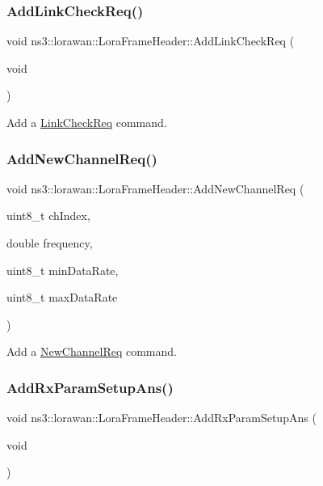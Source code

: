\subsubsection{\texorpdfstring{Add\+Link\+Check\+Req()}{AddLinkCheckReq()}}
{\footnotesize\ttfamily void ns3\+::lorawan\+::\+Lora\+Frame\+Header\+::\+Add\+Link\+Check\+Req (\begin{DoxyParamCaption}\item[{void}]{ }\end{DoxyParamCaption})}

Add a \hyperlink{classns3_1_1lorawan_1_1LinkCheckReq}{Link\+Check\+Req} command. \mbox{\label{classns3_1_1lorawan_1_1LoraFrameHeader_a30b475f8cbb1151fbe0369ffc5ee6441}} 
\subsubsection{\texorpdfstring{Add\+New\+Channel\+Req()}{AddNewChannelReq()}}
{\footnotesize\ttfamily void ns3\+::lorawan\+::\+Lora\+Frame\+Header\+::\+Add\+New\+Channel\+Req (\begin{DoxyParamCaption}\item[{uint8\+\_\+t}]{ch\+Index,  }\item[{double}]{frequency,  }\item[{uint8\+\_\+t}]{min\+Data\+Rate,  }\item[{uint8\+\_\+t}]{max\+Data\+Rate }\end{DoxyParamCaption})}

Add a \hyperlink{classns3_1_1lorawan_1_1NewChannelReq}{New\+Channel\+Req} command. \mbox{\label{classns3_1_1lorawan_1_1LoraFrameHeader_a455c58eda429169dffe119433cb8d70b}} 
\subsubsection{\texorpdfstring{Add\+Rx\+Param\+Setup\+Ans()}{AddRxParamSetupAns()}}
{\footnotesize\ttfamily void ns3\+::lorawan\+::\+Lora\+Frame\+Header\+::\+Add\+Rx\+Param\+Setup\+Ans (\begin{DoxyParamCaption}\item[{void}]{ }\end{DoxyParamCaption})}

